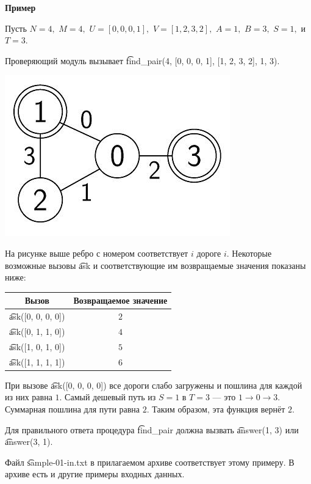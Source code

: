 \bf{Пример}

Пусть $N=4,$ $M=4,$ $U=[0,0,0,1],$ $V=[1,2,3,2],$ $A=1,$ $B=3,$ $S=1,$ и $T=3.$

Проверяющий модуль вызывает \t{find_pair(4, [0, 0, 0, 1], [1, 2, 3, 2], 1, 3).}

\includegraphics{image0.jpg}

На рисунке выше ребро с номером соответствует $i$ дороге $i.$ 
Некоторые возможные вызовы \t{ask} и соответствующие им возвращаемые значения показаны ниже:

\begin{tabular}{|c|c|}\hline
\bf{Вызов}&\bf{Возвращаемое значение} \\\hline
\t{ask([0, 0, 0, 0])}&$2$ \\\hline
\t{ask([0, 1, 1, 0])}&$4$ \\\hline
\t{ask([1, 0, 1, 0])}&$5$ \\\hline
\t{ask([1, 1, 1, 1])}&$6$ \\\hline
\end{tabular}

При вызове \t{ask([0, 0, 0, 0])} все дороги слабо загружены и пошлина для каждой из них равна $1.$ Самый дешевый путь из $S=1$ в $T=3$ --- это $1 \rightarrow 0 \rightarrow 3.$ Суммарная пошлина для пути равна $2.$ Таким образом, эта функция вернёт $2.$

Для правильного ответа процедура \t{find_pair} должна вызвать \t{answer(1, 3)} или \t{answer(3, 1)}.

Файл \t{sample-01-in.txt} в прилагаемом архиве соответствует этому примеру. В архиве есть и другие примеры входных данных.
